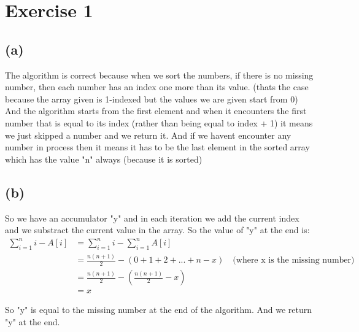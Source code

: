 \documentclass{article}
\begin{document}
\section*{Exercise 1}

\subsection*{(a)}
The algorithm is correct because when we sort the numbers, if there is no missing number, then each number has an index one more than its value.
(thats the case because the array given is 1-indexed but the values we are given start from 0)
And the algorithm starts from the first element and when it encounters the first number that is equal to its index (rather than being equal to index + 1) it means we just skipped
a number and we return it. And if we havent encounter any number in process then it means it has to be the last element in the sorted array which has the value "n" always (because it is sorted)

\subsection*{(b)}
So we have an accumulator "y" and in each iteration we add the current index and we substract the current value in the array. So the value of "y"
at the end is:
\begin{align*}
   \sum_{i = 1}^{n} i - A[i] &= \sum_{i = 1}^{n} i - \sum_{i = 1}^{n} A[i] \\
   &= \frac{n(n+1)}{2} - \left(0 + 1 + 2 + ... + n - x\right) \quad \text{(where x is the missing number)} \\
   &= \frac{n(n+1)}{2} - \left(\frac{n(n+1)}{2} - x\right) \\
   &= x
\end{align*}

So "y" is equal to the missing number at the end of the algorithm. And we return "y" at the end.
\end{document}
